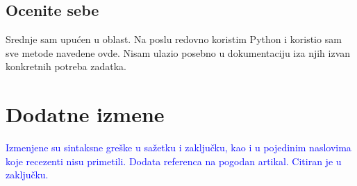 \documentclass[a4paper]{report}
\newcommand{\odgovor}[1]{\textcolor{blue}{#1}}
\begin{document}
\section{Ocenite sebe}
Srednje sam upućen u oblast.
Na poslu redovno koristim Python i koristio sam sve metode navedene ovde. Nisam ulazio posebno u dokumentaciju iza njih izvan konkretnih potreba zadatka.


\chapter{Dodatne izmene}
\odgovor{Izmenjene su sintaksne greške u sažetku i zaključku, kao i u pojedinim naslovima koje recezenti nisu primetili.}
\odgovor{Dodata referenca na pogodan artikal. Citiran je u zaključku.}
\end{document}
